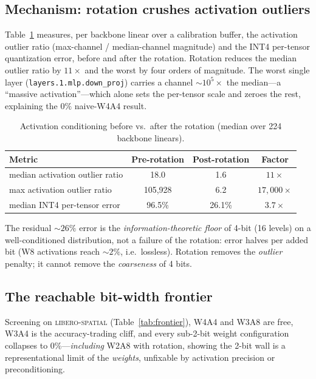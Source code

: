 \documentclass[conference]{IEEEtran}
\begin{document}
\subsection{Mechanism: rotation crushes activation outliers}
Table~\ref{tab:mech} measures, per backbone linear over a calibration buffer, the activation
outlier ratio (max-channel / median-channel magnitude) and the INT4 per-tensor quantization
error, before and after the rotation. Rotation reduces the median outlier ratio by $11\times$
and the worst by four orders of magnitude. The worst single layer
(\texttt{layers.1.mlp.down\_proj}) carries a channel $\sim\!10^5\times$ the median---a
``massive activation''---which alone sets the per-tensor scale and zeroes the rest, explaining
the $0\%$ naive-W4A4 result.

\begin{table}[h]\centering
\caption{Activation conditioning before vs.\ after the rotation (median over 224 backbone
linears).}
\label{tab:mech}
\begin{tabular}{lccc}
\toprule
Metric & Pre-rotation & Post-rotation & Factor \\
\midrule
median activation outlier ratio & 18.0 & 1.6 & $11\times$ \\
max activation outlier ratio & 105{,}928 & 6.2 & $17{,}000\times$ \\
median INT4 per-tensor error & 96.5\% & 26.1\% & $3.7\times$ \\
\bottomrule
\end{tabular}
\end{table}

The residual $\sim\!26\%$ error is the \emph{information-theoretic floor} of 4-bit (16 levels)
on a well-conditioned distribution, not a failure of the rotation: error halves per added bit
(W8 activations reach $\sim\!2\%$, i.e.\ lossless). Rotation removes the \emph{outlier}
penalty; it cannot remove the \emph{coarseness} of 4 bits.

\subsection{The reachable bit-width frontier}
Screening on \textsc{libero-spatial} (Table~\ref{tab:frontier}), W4A4 and W3A8 are free,
W3A4 is the accuracy-trading cliff, and every sub-2-bit weight configuration collapses to
$0\%$---\emph{including} W2A8 with rotation, showing the 2-bit wall is a representational
limit of the \emph{weights}, unfixable by activation precision or preconditioning.
\end{document}
